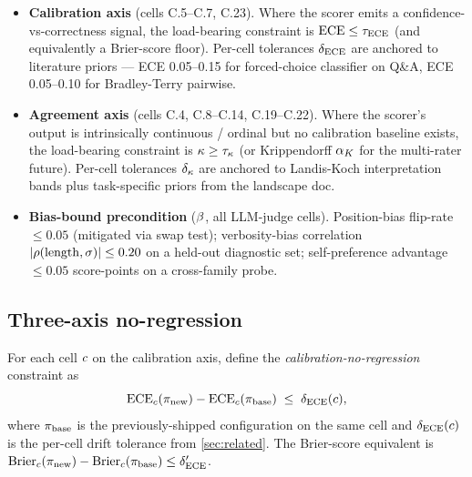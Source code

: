 \begin{itemize}[leftmargin=*]
  \item \textbf{Calibration axis} (cells C.5--C.7, C.23). Where the
        scorer emits a confidence-vs-correctness signal, the load-bearing
        constraint is $\mathrm{ECE} \leq \tau_{\mathrm{ECE}}$ (and equivalently
        a Brier-score floor). Per-cell tolerances $\delta_{\mathrm{ECE}}$ are
        anchored to literature priors --- ECE 0.05--0.15 for
        forced-choice classifier on Q\&A, ECE 0.05--0.10 for
        Bradley-Terry pairwise.
  \item \textbf{Agreement axis} (cells C.4, C.8--C.14, C.19--C.22).
        Where the scorer's output is intrinsically continuous /
        ordinal but no calibration baseline exists, the load-bearing
        constraint is $\kappa \geq \tau_{\kappa}$ (or
        Krippendorff $\alpha_K$ for the multi-rater future).
        Per-cell tolerances $\delta_{\kappa}$ are anchored to
        Landis-Koch interpretation bands plus task-specific priors
        from the landscape doc.
  \item \textbf{Bias-bound precondition} ($\beta$, all LLM-judge
        cells). Position-bias flip-rate $\leq 0.05$ (mitigated via
        swap test); verbosity-bias correlation $|\rho(\mathrm{length},
        \sigma)| \leq 0.20$ on a held-out diagnostic set; self-preference
        advantage $\leq 0.05$ score-points on a cross-family probe.
\end{itemize}


\subsection{Three-axis no-regression}

For each cell $c$ on the calibration axis, define the
\emph{calibration-no-regression} constraint as
\begin{equation}
  \mathrm{ECE}_{c}(\pi_{\mathrm{new}}) - \mathrm{ECE}_{c}(\pi_{\mathrm{base}})
  \;\leq\; \delta_{\mathrm{ECE}}(c),
  \label{eq:cal-noreg}
\end{equation}
where $\pi_{\mathrm{base}}$ is the previously-shipped configuration
on the same cell and $\delta_{\mathrm{ECE}}(c)$ is the per-cell drift
tolerance from \cref{sec:related}. The Brier-score equivalent is
$\mathrm{Brier}_{c}(\pi_{\mathrm{new}}) -
\mathrm{Brier}_{c}(\pi_{\mathrm{base}}) \leq \delta_{\mathrm{ECE}}'$.

